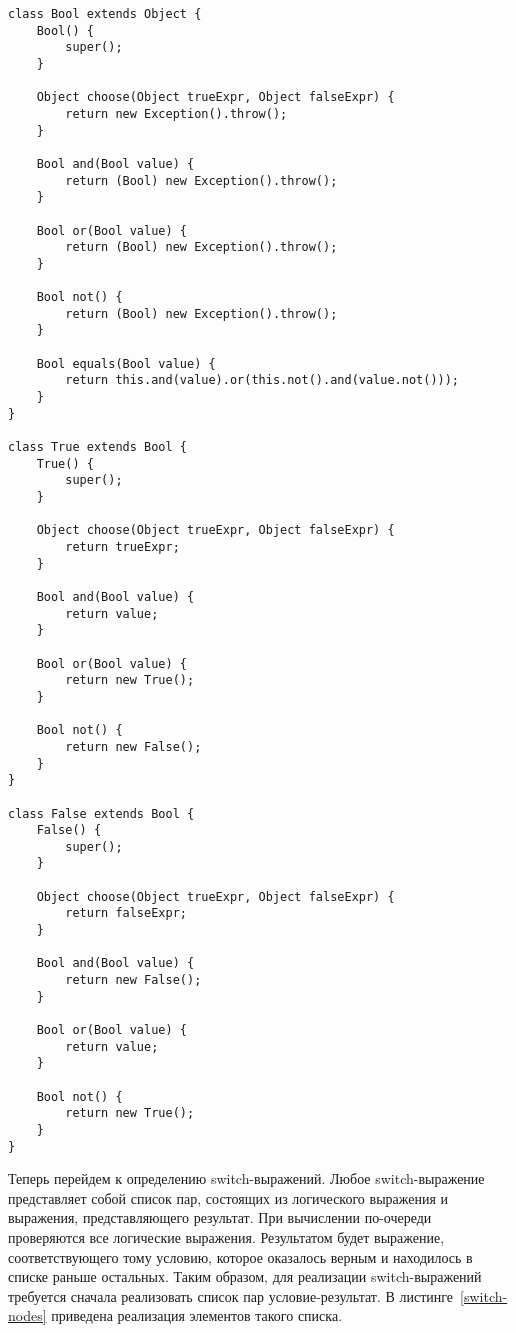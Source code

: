 \begin{lstlisting}[float=htb,label=bool,caption=Определение логического типа данных]
class Bool extends Object {
    Bool() {
        super();
    }

    Object choose(Object trueExpr, Object falseExpr) {
        return new Exception().throw();
    }

    Bool and(Bool value) {
        return (Bool) new Exception().throw();
    }

    Bool or(Bool value) {
        return (Bool) new Exception().throw();
    }

    Bool not() {
        return (Bool) new Exception().throw();
    }

    Bool equals(Bool value) {
        return this.and(value).or(this.not().and(value.not()));
    }
}

class True extends Bool {
    True() {
        super();
    }

    Object choose(Object trueExpr, Object falseExpr) {
        return trueExpr;
    }

    Bool and(Bool value) {
        return value;
    }

    Bool or(Bool value) {
        return new True();
    }

    Bool not() {
        return new False();
    }
}

class False extends Bool {
    False() {
        super();
    }

    Object choose(Object trueExpr, Object falseExpr) {
        return falseExpr;
    }

    Bool and(Bool value) {
        return new False();
    }

    Bool or(Bool value) {
        return value;
    }

    Bool not() {
        return new True();
    }
}
\end{lstlisting}
Теперь перейдем к определению switch-выражений. Любое switch-выражение представляет собой список пар, состоящих из логического выражения и выражения, представляющего результат.
При вычислении по-очереди проверяются все логические выражения. Результатом будет выражение, соответствующего тому условию, которое оказалось верным и находилось в списке раньше остальных.
Таким образом, для реализации switch-выражений требуется сначала реализовать список пар условие-результат. В листинге~\ref{switch-nodes} приведена реализация элементов такого списка.
